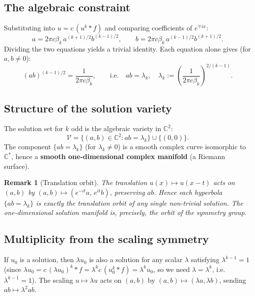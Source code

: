 \documentclass[12pt]{article}
\newtheorem{remark}[theorem]{Remark}
\newcommand{\C}{\mathbb{C}}
\begin{document}
\subsection{The algebraic constraint}

Substituting into $u = c\,(u^k\ast f)$ and comparing coefficients of
$e^{\mp ix}$:
\[
  a = 2\pi c\beta_k\,a^{(k+1)/2}b^{(k-1)/2},
  \qquad
  b = 2\pi c\beta_k\,a^{(k-1)/2}b^{(k+1)/2}.
\]
Dividing the two equations yields a trivial identity.
Each equation alone gives (for $a,b \neq 0$):
\begin{equation}
  \label{eq:constraint}
  (ab)^{(k-1)/2} = \frac{1}{2\pi c\beta_k},
  \qquad\text{i.e.}\quad
  ab = \lambda_k, \quad
  \lambda_k := \left(\frac{1}{2\pi c\beta_k}\right)^{\!2/(k-1)}.
\end{equation}

\subsection{Structure of the solution variety}

The solution set for $k$ odd is the algebraic variety in $\C^2$:
\[
  \mathcal{V} = \{(a,b)\in\C^2 : ab = \lambda_k\} \cup \{(0,0)\}.
\]
The component $\{ab = \lambda_k\}$ (for $\lambda_k \neq 0$) is a smooth
complex curve isomorphic to $\C^*$, hence a \textbf{smooth one-dimensional
complex manifold} (a Riemann surface).

\begin{remark}[Translation orbit]
  The translation $u(x)\mapsto u(x-t)$ acts on $(a,b)$ by
  $(a,b)\mapsto (e^{-it}a,\,e^{it}b)$, preserving $ab$.
  Hence each hyperbola $\{ab=\lambda_k\}$ is exactly the translation orbit
  of any single non-trivial solution.
  The one-dimensional solution manifold is, precisely, the orbit of
  the symmetry group.
\end{remark}

\subsection{Multiplicity from the scaling symmetry}

If $u_0$ is a solution, then $\lambda u_0$ is also a solution for any scalar
$\lambda$ satisfying $\lambda^{k-1} = 1$ (since
$\lambda u_0 = c\,(\lambda u_0)^k\ast f = \lambda^k c\,(u_0^k\ast f) = \lambda^k u_0$,
so we need $\lambda = \lambda^k$, i.e.\ $\lambda^{k-1}=1$).
The scaling $u \mapsto \lambda u$ acts on $(a,b)$ by
$(a,b)\mapsto(\lambda a,\lambda b)$, sending $ab\mapsto\lambda^2 ab$.
\end{document}
